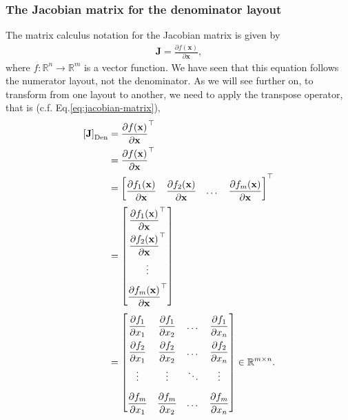 \documentclass{article}
\begin{document}
\subsubsection{The Jacobian matrix for the denominator layout}
The matrix calculus notation for the Jacobian matrix is given by
\begin{align}
    \mathbf{J} = \frac{\partial f(\mathbf{x})}{\partial \mathbf{x}},
\end{align}
where \(f: \mathbb{R}^{n} \rightarrow \mathbb{R}^{m}\) is a vector function. We have seen that this equation follows the numerator layout, not the denominator. As we will see further on, to transform from one layout to another, we need to apply the transpose operator, that is (c.f. Eq.\eqref{eq:jacobian-matrix}),
\begin{align}
    \left[ \mathbf{J} \right]_{\textnormal{Den}} & = \frac{\partial f(\mathbf{x})}{\partial \mathbf{x}}^{\top} \\
    & = \frac{\partial f(\mathbf{x})}{\partial \mathbf{x}}^\top\\
    & = \begin{bmatrix}
        \dfrac{\partial f_1(\mathbf{x})}{\partial \mathbf{x}} & \dfrac{\partial f_2(\mathbf{x})}{\partial \mathbf{x}} & \dots & \dfrac{\partial f_m(\mathbf{x})}{\partial \mathbf{x}}
    \end{bmatrix}^\top \\
    & = \renewcommand{\arraystretch}{2.2}\begin{bmatrix}
        \dfrac{\partial f_1(\mathbf{x})}{\partial \mathbf{x}}^\top \\ \dfrac{\partial f_2(\mathbf{x})}{\partial \mathbf{x}}^\top \\ \vdots \\ \dfrac{\partial f_m(\mathbf{x})}{\partial \mathbf{x}}^\top
    \end{bmatrix} \\
    & = \renewcommand{\arraystretch}{2.2}\begin{bmatrix}
        \dfrac{\partial f_1}{\partial x_1} & \dfrac{\partial f_1}{\partial x_2} & \dots & \dfrac{\partial f_1}{\partial x_n} \\
        \dfrac{\partial f_2}{\partial x_1} & \dfrac{\partial f_2}{\partial x_2} & \dots & \dfrac{\partial f_2}{\partial x_n} \\
        \vdots & \vdots & \ddots & \vdots \\
        \dfrac{\partial f_m}{\partial x_1} & \dfrac{\partial f_m}{\partial x_2} & \dots & \dfrac{\partial f_m}{\partial x_n} \\
    \end{bmatrix} \in \mathbb{R}^{m \times n}.
\end{align}
\end{document}
